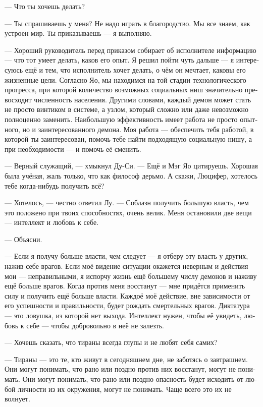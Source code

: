 \documentclass[a4paper,12pt,fleqn]{book}\usepackage{polyglossia}\setdefaultlanguage[babelshorthands=true]{russian}\setotherlanguage{english}\defaultfontfeatures{Ligatures=TeX,Mapping=tex-text}\usepackage{xcolor}\newcommand{\ml}[3]{#2}
\begin{document}
{\ml{$0$}
{--- Что ты хочешь делать?}
{``What do you want to do?''}

\ml{$0$}
{--- Ты спрашиваешь у меня?}
{``You ask me?}
Не надо играть в благородство.
Мы все знаем, как устроен мир.
\ml{$0$}
{Ты приказываешь --- я выполняю.}
{You give the order, and I obey.''}

--- Хороший руководитель перед приказом собирает об исполнителе информацию --- что тот умеет делать, каков его опыт.
Я решил пойти чуть дальше --- я интересуюсь ещё и тем, что исполнитель хочет делать, о чём он мечтает, каковы его жизненные цели.
Согласно Яо, мы находимся на той стадии технологического прогресса, при которой количество возможных социальных ниш значительно превосходит численность населения.
Другими словами, каждый демон может стать не просто винтиком в системе, а узлом, который сложно или даже невозможно полноценно заменить.
Наибольшую эффективность имеет работа не просто опытного, но и заинтересованного демона.
Моя работа --- обеспечить тебя работой, в которой ты заинтересован, помочь тебе найти подходящую социальную нишу, а при необходимости --- и помочь её сменить.

--- Верный служащий, --- хмыкнул Ду-Си.
--- Ещё и Мэг Яо цитируешь.
Хорошая была учёная, жаль только, что как философ дерьмо.
А скажи, Люцифер, хотелось тебе когда-нибудь получить всё?

--- Хотелось, --- честно ответил Лу.
--- Соблазн получить большую власть, чем это положено при твоих способностях, очень велик.
Меня остановили две вещи --- интеллект и любовь к себе.

--- Объясни.

--- Если я получу больше власти, чем следует --- я отберу эту власть у других, нажив себе врагов.
Если моё видение ситуации окажется неверным и действия мои --- неправильными, я испорчу жизнь ещё большему числу демонов и наживу ещё больше врагов.
Когда против меня восстанут --- мне придётся применить силу и получить ещё больше власти.
Каждоё моё действие, вне зависимости от его успешности и правильности, будет рождать смертельных врагов.
Диктатура --- это ловушка, из которой нет выхода.
Интеллект нужен, чтобы её увидеть, любовь к себе --- чтобы добровольно в неё не залезть.

--- Хочешь сказать, что тираны всегда глупы и не любят себя самих?

--- Тираны --- это те, кто живут в сегодняшнем дне, не заботясь о завтрашнем.
Они могут понимать, что рано или поздно против них восстанут, могут не понимать.
Они могут понимать, что рано или поздно опасность будет исходить от любой личности из их окружения, могут не понимать.
Чаще всего это их не волнует.

}
\end{document}
